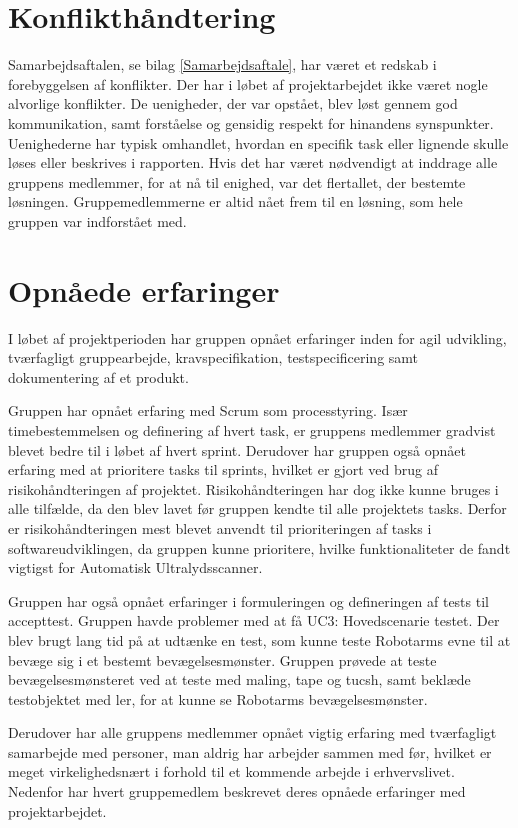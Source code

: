 \section{Konflikthåndtering}
Samarbejdsaftalen, se bilag \ref{Samarbejdsaftale}, har været et redskab i forebyggelsen af konflikter. Der har i løbet af projektarbejdet ikke været nogle alvorlige konflikter. De uenigheder, der var opstået, blev løst gennem god kommunikation, samt forståelse og gensidig respekt for hinandens synspunkter. Uenighederne har typisk omhandlet, hvordan en specifik task eller lignende skulle løses eller beskrives i rapporten. Hvis det har været nødvendigt at inddrage alle gruppens medlemmer, for at nå til enighed, var det flertallet, der bestemte løsningen. Gruppemedlemmerne er altid nået frem til en løsning, som hele gruppen var indforstået med.

\section{Opnåede erfaringer}
I løbet af projektperioden har gruppen opnået erfaringer inden for agil udvikling, tværfagligt gruppearbejde, kravspecifikation, testspecificering samt dokumentering af et produkt.

Gruppen har opnået erfaring med Scrum som processtyring. Især timebestemmelsen og definering af hvert task, er gruppens medlemmer gradvist blevet bedre til i løbet af hvert sprint. Derudover har gruppen også opnået erfaring med at prioritere tasks til sprints, hvilket er gjort ved brug af risikohåndteringen af projektet. Risikohåndteringen har dog ikke kunne bruges i alle tilfælde, da den blev lavet før gruppen kendte til alle projektets tasks. Derfor er risikohåndteringen mest blevet anvendt til prioriteringen af tasks i softwareudviklingen, da gruppen kunne prioritere, hvilke funktionaliteter de fandt vigtigst for Automatisk Ultralydsscanner. 

Gruppen har også opnået erfaringer i formuleringen og defineringen af tests til accepttest. Gruppen havde problemer med at få UC3: Hovedscenarie testet. Der blev brugt lang tid på at udtænke en test, som kunne teste Robotarms evne til at bevæge sig i et bestemt bevægelsesmønster. Gruppen prøvede at teste bevægelsesmønsteret ved at teste med maling, tape og tucsh, samt beklæde testobjektet med ler, for at kunne se Robotarms bevægelsesmønster. 

Derudover har alle gruppens medlemmer opnået vigtig erfaring med tværfagligt samarbejde med personer, man aldrig har arbejder sammen med før, hvilket er meget virkelighedsnært i forhold til et kommende arbejde i erhvervslivet.
Nedenfor har hvert gruppemedlem beskrevet deres opnåede erfaringer med projektarbejdet. 

